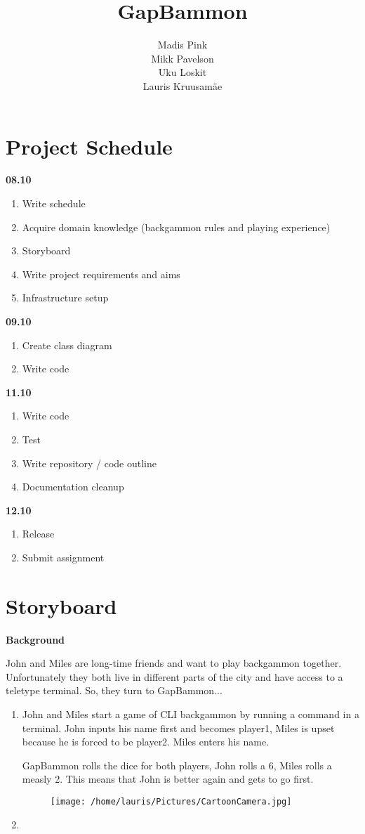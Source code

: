 \documentclass[11pt]{article}
\title{\textbf{GapBammon}}
\author{Madis Pink\\
		Mikk Pavelson\\
		Uku Loskit\\
		Lauris Kruusamäe}
\date{}
\begin{document}
\maketitle

\section{Project Schedule}
\textbf{08.10}
\begin{enumerate}[1]
\item Write schedule
\item Acquire domain knowledge (backgammon rules and playing experience)
\item Storyboard
\item Write project requirements and aims
\item Infrastructure setup
\end{enumerate}
\textbf{09.10}
\begin{enumerate}[1]
\item Create class diagram
\item Write code
\end{enumerate}
\textbf{11.10}
\begin{enumerate}[1]
\item Write code
\item Test
\item Write repository / code outline
\item Documentation cleanup
\end{enumerate}
\textbf{12.10}
\begin{enumerate}[1]
\item Release
\item Submit assignment
\end{enumerate}

\newpage
\section{Storyboard}

\textbf{Background}

John and Miles are long-time friends and want to play backgammon together. Unfortunately they both live in different parts of the city and have access to a teletype terminal. So, they turn to GapBammon...

\begin{enumerate}[I]
\item John and Miles start a game of CLI backgammon by running a command in a terminal. John inputs his name first and becomes player1, Miles is upset because he is forced to be player2. Miles enters his name.
	
GapBammon rolls the dice for both players, John rolls a 6, Miles rolls a measly 2. This means that John is better again and gets to go first. 

\begin{figure}
\texttt{[image: /home/lauris/Pictures/CartoonCamera.jpg]}
\end{figure}
\item
\end{enumerate}
\end{document}
